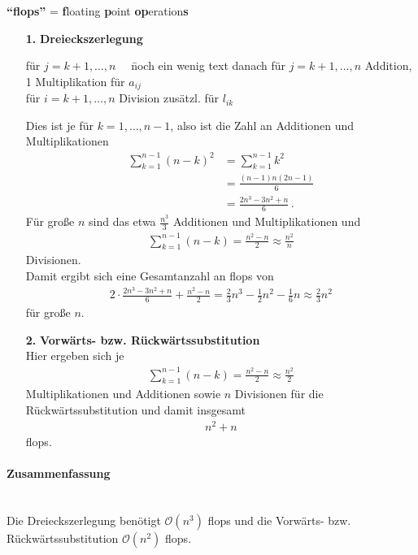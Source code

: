 \textbf{\enquote{flops} }= \textbf{f}loating \textbf{p}oint \textbf{op}eration\textbf{s} \\
\begin{enumerate}
\item[\textbf{1.}] \textbf{Dreieckszerlegung} 
  \begin{tabbing}
    für $j=k+1, \dots, n\quad$ \= noch ein wenig text danach \kill
    für $j=k+1, \dots, n$  Addition, 1 Multiplikation für $a_{ij}$ \\
    für $i=k+1, \dots, n$  Division zusätzl. für $ l_{ik}$
  \end{tabbing}
  Dies ist je für $k=1, \dots, n-1$, also ist die Zahl an Additionen und Multiplikationen
  \begin{align*}
    \sum_{k=1}^{n-1}(n-k)^2 &= \sum_{k=1}^{n-1}k^2 \\
                            &= \frac{(n-1)n(2n-1)}{6} \\
                            &= \frac{2n^3-3n^2+n}{6}\, .
  \end{align*}
  Für große $n$ sind das etwa $\frac{n^3}{3}$ Additionen und Multiplikationen und
  \begin{gather*}
    \sum_{k=1}^{n-1} (n-k) = \frac{n^2-n}{2} \approx \frac{n^2}{n}
  \end{gather*}
  Divisionen. \\
  Damit ergibt sich eine Gesamtanzahl an flops von
  \begin{gather*}
    2\cdot\frac{2n^3-3n^2+n}{6} + \frac{n^2-n}{2} 
    = \frac{2}{3} n^3 - \frac{1}{2}n^2 - \frac{1}{6} n
    \approx \frac{2}{3}n^2
  \end{gather*}
  für große $n$.
  
\item[\textbf{2.}] \textbf{Vorwärts- bzw. Rückwärtssubstitution}  \\
  Hier ergeben sich je
  \begin{gather*}
    \sum_{k=1}^{n-1} (n-k) = \frac{n^2-n}{2} \approx \frac{n^2}{2}
  \end{gather*}
  Multiplikationen und Additionen sowie 
  $n$ Divisionen für die Rückwärtssubstitution und damit insgesamt \begin{gather*}n^2+n\end{gather*} flops.	
\end{enumerate}
\paragraph{Zusammenfassung}~ \\
Die Dreieckszerlegung benötigt $\mathcal{O}(n^3)$ flops und 
die Vorwärts- bzw. Rückwärtssubstitution $\mathcal{O}(n^2)$ flops.



